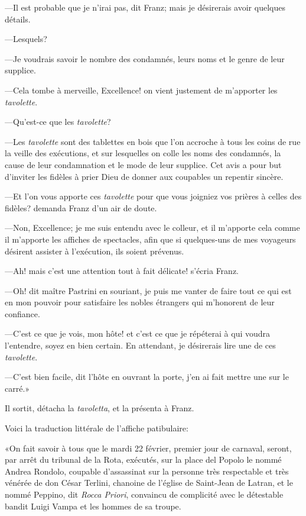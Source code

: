 —Il est probable que je n'irai pas, dit Franz; mais je désirerais avoir quelques détails. 

—Lesquels? 

—Je voudrais savoir le nombre des condamnés, leurs noms et le genre de leur supplice. 

—Cela tombe à merveille, Excellence! on vient justement de m'apporter les \textit{tavolette}. 

—Qu'est-ce que les \textit{tavolette}? 

—Les \textit{tavolette} sont des tablettes en bois que l'on accroche à tous les coins de rue la veille des exécutions, et sur lesquelles on colle les noms des condamnés, la cause de leur condamnation et le mode de leur supplice. Cet avis a pour but d'inviter les fidèles à prier Dieu de donner aux coupables un repentir sincère. 

—Et l'on vous apporte ces \textit{tavolette} pour que vous joigniez vos prières à celles des fidèles? demanda Franz d'un air de doute. 

—Non, Excellence; je me suis entendu avec le colleur, et il m'apporte cela comme il m'apporte les affiches de spectacles, afin que si quelques-uns de mes voyageurs désirent assister à l'exécution, ils soient prévenus. 

—Ah! mais c'est une attention tout à fait délicate! s'écria Franz. 

—Oh! dit maître Pastrini en souriant, je puis me vanter de faire tout ce qui est en mon pouvoir pour satisfaire les nobles étrangers qui m'honorent de leur confiance. 

—C'est ce que je vois, mon hôte! et c'est ce que je répéterai à qui voudra l'entendre, soyez en bien certain. En attendant, je désirerais lire une de ces \textit{tavolette}. 

—C'est bien facile, dit l'hôte en ouvrant la porte, j'en ai fait mettre une sur le carré.» 

Il sortit, détacha la \textit{tavoletta}, et la présenta à Franz. 

Voici la traduction littérale de l'affiche patibulaire: 

«On fait savoir à tous que le mardi 22 février, premier jour de carnaval, seront, par arrêt du tribunal de la Rota, exécutés, sur la place del Popolo le nommé Andrea Rondolo, coupable d'assassinat sur la personne très respectable et très vénérée de don César Terlini, chanoine de l'église de Saint-Jean de Latran, et le nommé Peppino, dit \textit{Rocca Priori}, convaincu de complicité avec le détestable bandit Luigi Vampa et les hommes de sa troupe. 


